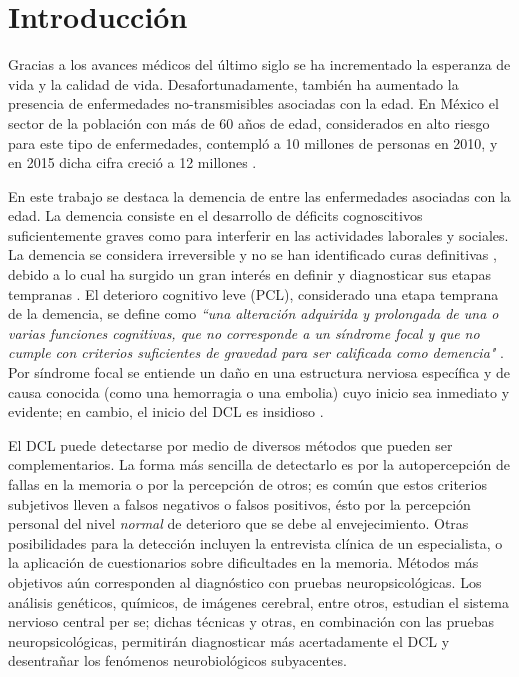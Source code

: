 
\chapter*{Introducción}

Gracias a los avances médicos del último siglo se ha incrementado la esperanza de vida y la calidad de vida. 
%
Desafortunadamente, también ha aumentado la presencia de enfermedades no-transmisibles asociadas con la edad. 
%
En México el sector de la población con más de 60 años de edad, considerados en alto riesgo para este tipo de enfermedades, contempló a 10 millones de personas en 2010, y en 2015 dicha cifra creció a 12 millones \cite{Censo10,Intercensal15}.

En este trabajo se destaca la demencia de entre las enfermedades asociadas con la edad.
%
La demencia consiste en el desarrollo de déficits cognoscitivos suficientemente graves como para interferir en las actividades laborales y sociales.
%
La demencia se considera irreversible y no se han identificado curas definitivas \cite{PlanAlzheimer04}, debido a lo cual ha surgido un gran interés en definir y diagnosticar sus etapas tempranas \cite{Knopman01}.
%
El deterioro cognitivo leve (PCL), considerado una etapa temprana de la demencia, se define como \textit{``una alteración adquirida y prolongada de una o varias funciones cognitivas, que no corresponde a un síndrome focal y que no cumple con criterios suficientes de gravedad para ser calificada como demencia"} \cite{Robles02}.
%
Por síndrome focal se entiende un daño en una estructura nerviosa específica y de causa conocida (como una hemorragia o una embolia) cuyo inicio sea inmediato y evidente; en cambio, el inicio del DCL es insidioso \cite{Petersen01}.

El DCL puede detectarse por medio de diversos métodos que pueden ser complementarios. 
%
La forma más sencilla de detectarlo es por la autopercepción de fallas en la memoria o por la percepción de otros;
es común que estos criterios subjetivos lleven a falsos negativos o falsos positivos, ésto por la percepción personal del nivel \textit{normal} de deterioro que se debe al envejecimiento.
%
Otras posibilidades para la detección incluyen la entrevista clínica de un especialista, o la aplicación de cuestionarios sobre dificultades en la memoria. 
%
Métodos más objetivos aún corresponden al diagnóstico con pruebas neuropsicológicas. 
%
Los análisis genéticos, químicos, de imágenes cerebral, entre otros, estudian el sistema nervioso central per se; dichas técnicas y otras, en combinación con las pruebas neuropsicológicas, permitirán diagnosticar más acertadamente el DCL y desentrañar los fenómenos neurobiológicos subyacentes.

